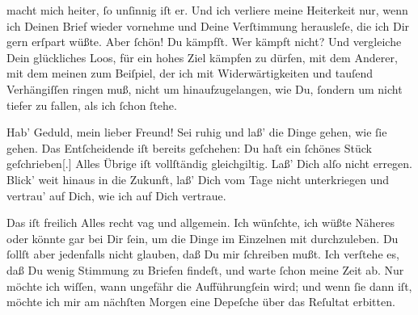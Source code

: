                macht mich heiter,{ }ſo unſinnig iſt er. {\pb}Und ich
               verliere meine Heiterkeit nur, wenn ich Deinen Brief wieder vornehme und Deine
               Verſtimmung herausleſe, die ich Dir gern erſpart wüßte. Aber{ }ſchön! Du kämpfſt. Wer
               kämpft nicht? Und vergleiche Dein glückliches Loos, für ein hohes Ziel kämpfen zu
               dürfen, mit dem Anderer, mit dem meinen zum Beiſpiel, der ich mit Widerwärtigkeiten
               und tauſend Verhängiſſen ringen muß, nicht um hinaufzugelangen, wie Du,{ }ſondern um
               nicht tiefer zu fallen, als ich{ }ſchon{ }ſtehe.\pend
           
\pstart
           {\pb}Hab’ Geduld, mein lieber Freund! Sei ruhig und laß’
               die Dinge gehen, wie{ }ſie gehen. Das Entſcheidende iſt bereits geſchehen: Du haſt ein{ }ſchönes Stück
                  geſchrieben{[}.{]} Alles Übrige iſt vollſtändig gleichgiltig.  Laß’ Dich alſo nicht erregen. Blick’ weit hinaus in die Zukunft, laß’ Dich vom
               Tage nicht unterkriegen und vertrau’ auf Dich, wie ich auf Dich vertraue.\pend
           
\pstart
           Das iſt freilich Alles recht vag und allgemein. Ich wünſchte, ich wüßte  Näheres oder könnte gar bei Dir{ }ſein, um {\pb}die Dinge im Einzelnen mit durchzuleben. Du{ }ſollſt
               aber jedenfalls nicht glauben, daß Du mir{ }ſchreiben mußt. Ich verſtehe es, daß Du
               wenig Stimmung zu Briefen findeſt, und warte{ }ſchon meine Zeit ab. Nur möchte ich
               wiſſen, wann ungefähr die Aufführungſein wird; und wenn{ }ſie dann iſt, möchte ich mir am nächſten Morgen eine Depeſche über das Reſultat
               erbitten.\pend
           
